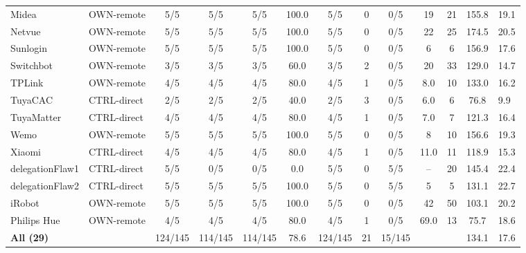 \begin{table}[t]
\begin{tabular*}{\linewidth}{@{\extracolsep{\fill}} ll ccccc ccc cc @{}}
Midea & OWN-remote & 5/5 & 5/5 & 5/5 & 100.0 & 5/5 & 0 & 0/5 & 19 & 21 & 155.8 & 19.1 \\
Netvue & OWN-remote & 5/5 & 5/5 & 5/5 & 100.0 & 5/5 & 0 & 0/5 & 22 & 25 & 174.5 & 20.5 \\
Sunlogin & OWN-remote & 5/5 & 5/5 & 5/5 & 100.0 & 5/5 & 0 & 0/5 & 6 & 6 & 156.9 & 17.6 \\
Switchbot & OWN-remote & 3/5 & 3/5 & 3/5 & 60.0 & 3/5 & 2 & 0/5 & 20 & 33 & 129.0 & 14.7 \\
TPLink & OWN-remote & 4/5 & 4/5 & 4/5 & 80.0 & 4/5 & 1 & 0/5 & 8.0 & 10 & 133.0 & 16.2 \\
TuyaCAC & CTRL-direct & 2/5 & 2/5 & 2/5 & 40.0 & 2/5 & 3 & 0/5 & 6.0 & 6 & 76.8 & 9.9 \\
TuyaMatter & CTRL-direct & 4/5 & 4/5 & 4/5 & 80.0 & 4/5 & 1 & 0/5 & 7.0 & 7 & 121.3 & 16.4 \\
Wemo & OWN-remote & 5/5 & 5/5 & 5/5 & 100.0 & 5/5 & 0 & 0/5 & 8 & 10 & 156.6 & 19.3 \\
Xiaomi & CTRL-direct & 4/5 & 4/5 & 4/5 & 80.0 & 4/5 & 1 & 0/5 & 11.0 & 11 & 118.9 & 15.3 \\
delegationFlaw1 & CTRL-direct & 5/5 & 0/5 & 0/5 & 0.0 & 5/5 & 0 & 5/5 & -- & 20 & 145.4 & 22.4 \\
delegationFlaw2 & CTRL-direct & 5/5 & 5/5 & 5/5 & 100.0 & 5/5 & 0 & 5/5 & 5 & 5 & 131.1 & 22.7 \\
iRobot & OWN-remote & 5/5 & 5/5 & 5/5 & 100.0 & 5/5 & 0 & 0/5 & 42 & 50 & 103.1 & 20.2 \\
Philips Hue & OWN-remote & 4/5 & 4/5 & 4/5 & 80.0 & 4/5 & 1 & 0/5 & 69.0 & 13 & 75.7 & 18.6 \\
\hline
\textbf{All (29)} &  & 124/145 & 114/145 & 114/145 & 78.6 & 124/145 & 21 & 15/145 &  &  & 134.1 & 17.6 \\
\hline\hline
\end{tabular*}
\end{table}
